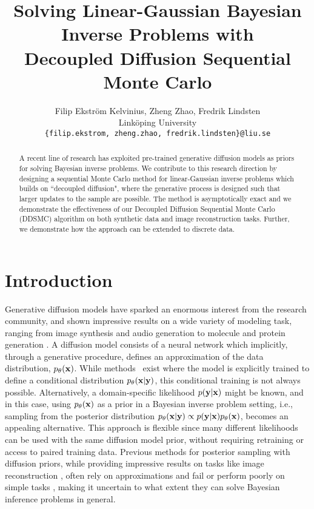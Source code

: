 \documentclass{proc}
\title{Solving Linear-Gaussian Bayesian Inverse Problems with\\Decoupled Diffusion Sequential Monte Carlo}
\author{Filip Ekström Kelvinius, Zheng Zhao, Fredrik Lindsten
\\
Linköping University
\\
\texttt{\{filip.ekstrom, zheng.zhao, fredrik.lindsten\}@liu.se}
}
\begin{document}
\maketitle

\begin{abstract}
A recent line of research has exploited pre-trained generative diffusion models as priors for solving Bayesian inverse problems. We contribute to this research direction by designing a sequential Monte Carlo method for linear-Gaussian inverse problems which builds on ``decoupled diffusion", where the generative process is designed such that larger updates to the sample are possible. The method is asymptotically exact and we demonstrate the effectiveness of our Decoupled Diffusion Sequential Monte Carlo (DDSMC) algorithm on both synthetic data and image reconstruction tasks. Further, we demonstrate how the approach can be extended to discrete data.
\end{abstract}

\section{Introduction}
Generative diffusion models \cite{sohl-dickstein_deep_2015, ho_denoising_2020-2, song_score-based_2021} have sparked an enormous interest from the research community, and shown impressive results on a wide variety of modeling task, ranging from image synthesis \citep{dhariwal_diffusion_2021-1, rombach_high-resolution_2022, saharia_photorealistic_2022} and audio generation \cite{chen_wavegrad_2020,kong_diffwave_2021} to molecule and protein generation \cite{hoogeboom_equivariant_2022, xu_geodiff_2022, corso_diffdock_2023}. A diffusion model consists of a neural network which implicitly, through a generative procedure, defines an approximation of the data distribution, $p_\theta(\mathbf{x})$. While methods~\citep[e.g.][]{ho_classifier-free_2022} exist where the model is explicitly trained to define a conditional distribution $p_\theta(\mathbf{x}|\mathbf{y})$, this conditional training is not always possible. Alternatively, a domain-specific likelihood $p(\mathbf{y}|\mathbf{x})$ might be known, and in this case, using $p_\theta(\mathbf{x})$ as a prior in a Bayesian inverse problem setting, i.e., sampling from the posterior distribution $p_\theta(\mathbf{x}|\mathbf{y}) \propto p(\mathbf{y}|\mathbf{x})p_\theta(\mathbf{x})$, becomes an appealing alternative. This approach is flexible since many different likelihoods can be used with the same diffusion model prior, without requiring retraining or access to paired training data. Previous methods for posterior sampling with diffusion priors, while providing impressive results on tasks like image reconstruction \citep{kawar_denoising_2022, chung_diffusion_2023, song2023pseudoinverseguided}, often rely on approximations and fail or perform poorly on simple tasks \citep[and our ]{cardoso_monte_2023-2}, making it uncertain to what extent they can solve Bayesian inference problems in general.
\end{document}
